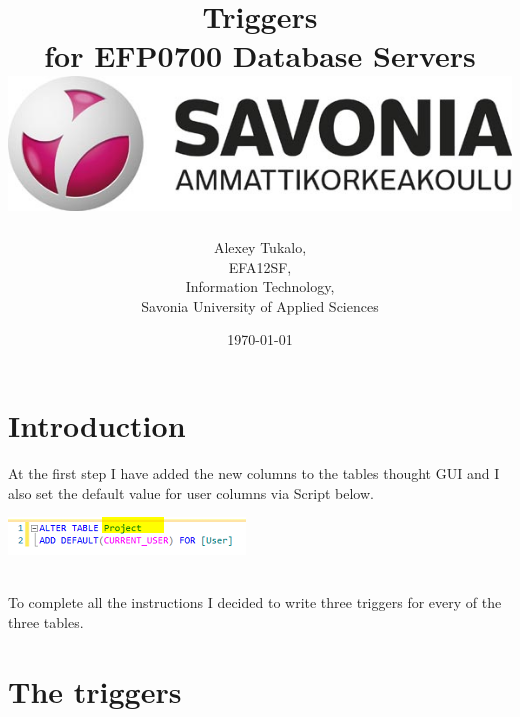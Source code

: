 \documentclass[english]{article}
\date{}
\begin{document}
\title{\vspace{2in}Triggers\\
\small for EFP0700 Database Servers\\
\vspace{0.5in}\includegraphics{savonia.jpg}}

\nopagebreak
\maketitle


\vspace{3in}

\author{
\begin{flushright}
Alexey Tukalo,\\
EFA12SF,\\
Information Technology,\\
Savonia University of Applied Sciences
\end{flushright}
}

\date{\today}
\thispagestyle{empty}

\newpage
\setcounter{page}{1}
\setcounter{tocdepth}{2}

\section{Introduction}
At the first step I have added the new columns to the tables thought GUI and I also set the default value for user columns via Script below.\\
\centerline{\includegraphics[scale=1]{triggers/Altertables}}\\
To complete all the instructions I decided to write three triggers for every of the three tables. 
\section{The triggers}
\end{document}
